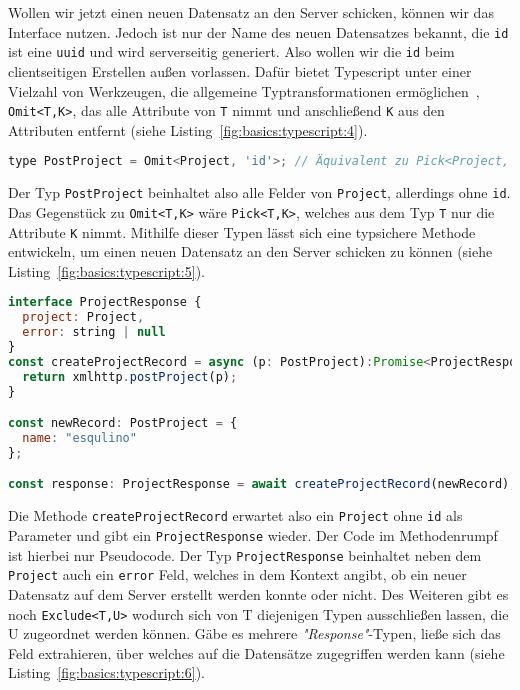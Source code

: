 Wollen wir jetzt einen neuen Datensatz an den Server schicken, können wir das Interface nutzen. Jedoch ist nur der Name des neuen Datensatzes bekannt,
die \texttt{id} ist eine \texttt{uuid} und wird serverseitig generiert. Also wollen wir die \texttt{id} beim clientseitigen Erstellen außen vorlassen.
Dafür bietet Typescript unter einer Vielzahl von Werkzeugen, die allgemeine Typtransformationen ermöglichen~\cite{typescript-utility-types},
\texttt{Omit<T,K>}, das alle Attribute von \texttt{T} nimmt und anschließend \texttt{K} aus den Attributen entfernt  (siehe Listing~\ref{fig:basics:typescript:4}).

\begin{lstlisting}[language=Javascript,float=h!,caption={Transformierter \texttt{Project} Typ}, label={fig:basics:typescript:4}]
type PostProject = Omit<Project, 'id'>; // Äquivalent zu Pick<Project, 'name'>
\end{lstlisting}

Der Typ \texttt{PostProject} beinhaltet also alle Felder von \texttt{Project}, allerdings ohne \texttt{id}. Das Gegenstück zu \texttt{Omit<T,K>} wäre \texttt{Pick<T,K>},
welches aus dem Typ \texttt{T} nur die Attribute \texttt{K} nimmt. Mithilfe dieser Typen lässt sich eine typsichere Methode entwickeln,
um einen neuen Datensatz an den Server schicken zu können (siehe Listing~\ref{fig:basics:typescript:5}).
\begin{lstlisting}[language=Javascript,float=h!,caption={Typen und Methode zum Abschicken eines \texttt{Project}-Datensatzes}, label={fig:basics:typescript:5}]
interface ProjectResponse {
  project: Project,
  error: string | null
}
const createProjectRecord = async (p: PostProject):Promise<ProjectResponse> => {
  return xmlhttp.postProject(p);
}

const newRecord: PostProject = {
  name: "esqulino"
};

const response: ProjectResponse = await createProjectRecord(newRecord);
\end{lstlisting}

Die Methode \texttt{createProjectRecord} erwartet also ein \texttt{Project} ohne \texttt{id} als Parameter und gibt ein \texttt{ProjectResponse} wieder.
Der Code im Methodenrumpf ist hierbei nur Pseudocode. Der Typ \texttt{ProjectResponse} beinhaltet neben dem \texttt{Project} auch ein \texttt{error} Feld,
welches in dem Kontext angibt, ob ein neuer Datensatz auf dem Server erstellt werden konnte oder nicht.
Des Weiteren gibt es noch \texttt{Exclude<T,U>} wodurch sich von T diejenigen Typen ausschließen lassen,
die U zugeordnet werden können. Gäbe es mehrere \emph{"Response"}-Typen, ließe sich das Feld extrahieren,
über welches auf die Datensätze zugegriffen werden kann (siehe Listing~\ref{fig:basics:typescript:6}).

